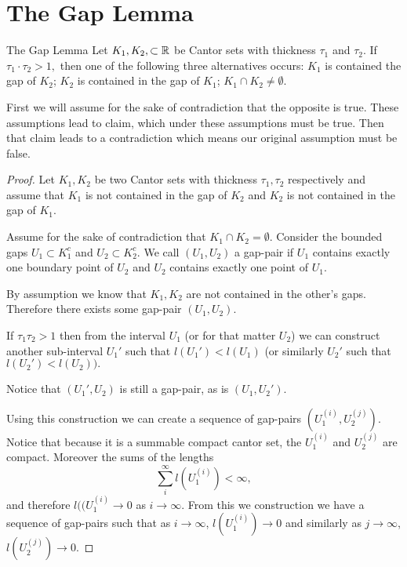 \section{The Gap Lemma}
\begin{lemma}{The Gap Lemma}\cite{palis&takens}
    Let $K_1, K_2, \subset \mathbb{R}$ be Cantor sets with thickness $\tau_1$ and  $\tau_2$.  If $\tau_1 \cdot \tau_2 >1,$ then one of the following three alternatives occurs: $K_1$ is contained the gap of $K_2$; $K_2$ is contained in the gap of $K_1$; $K_1 \cap K_2 \neq \emptyset.$
\end{lemma}
First we will assume for the sake of contradiction that the opposite is true.  These assumptions lead to claim, which under these assumptions must be true.  Then that claim leads to a contradiction which means our original assumption must be false.  
\begin{proof}
    Let $K_1, K_2$ be two Cantor sets with thickness $\tau_1, \tau_2$ respectively and assume that $K_1$ is not contained in the gap of $K_2$ and $K_2$ is not contained in the gap of $K_1$.  

    Assume for the sake of contradiction that $K_1 \cap K_2 = \emptyset$.  Consider the bounded gaps $U_1 \subset K_1^c$ and $U_2 \subset K_2^c$.  We call $(U_1, U_2)$ a gap-pair if $U_1$ contains exactly one boundary point of $U_2$ and $U_2$ contains exactly one point of $U_1$.  

    By assumption we know that $K_1, K_2$ are not contained in the other's gaps. Therefore there exists some gap-pair $(U_1, U_2).$

    \begin{claim}
        If $\tau_1\tau_2 > 1$ then from the interval $U_1$ (or for that matter $U_2$) we can construct another sub-interval $U_1'$ such that $l(U_1') < l(U_1)$ (or similarly $U_2'$ such that $l(U_2')<l(U_2)).$
    \end{claim}
    Notice that $(U_1',U_2)$ is still a gap-pair, as is $(U_1,U_2')$.
    
    Using this construction we can create a sequence of gap-pairs $(U_1^{(i)}, U_2^{(j)})$.  Notice that because it is a summable compact cantor set, the $U_1^{(i)}$ and $U_2^{(j)}$ are compact.  Moreover the sums of the lengths $$\sum_i^\infty l(U_1^{(i)}) < \infty,$$ and therefore $l((U_1^{(i)} \to 0$ as $i \to \infty$.   From this we construction we have a sequence of gap-pairs such that as $i \to \infty$, $l(U_1^{(i)}) \to 0$ and similarly as $j \to \infty$, $l(U_2^{(j)}) \to 0$.  
    

\end{proof}
